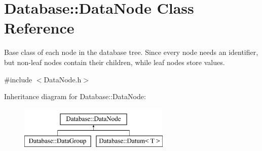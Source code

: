 \hypertarget{classDatabase_1_1DataNode}{}\section{Database\+:\+:Data\+Node Class Reference}
\label{classDatabase_1_1DataNode}


Base class of each node in the database tree. Since every node needs an identifier, but non-\/leaf nodes contain their children, while leaf nodes store values.  




{\ttfamily \#include $<$Data\+Node.\+h$>$}

Inheritance diagram for Database\+:\+:Data\+Node\+:\begin{figure}[H]
\begin{center}
\leavevmode
\includegraphics[height=2.000000cm]{classDatabase_1_1DataNode}
\end{center}
\end{figure}

